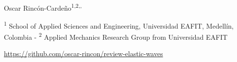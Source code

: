 \documentclass[11pt,twoside]{article}
\begin{document}
\begin{tcolorbox}[colback=white!20,colframe=gray!20,sharp corners]

{\begin{center}
Oscar Rincón-Cardeño\textsuperscript{1,2,,
}
\end{center}
}

\vspace{-0.3cm}

{\footnotesize
\textsuperscript{1} School of Applied Sciences and Engineering, Universidad EAFIT, 
Medellín, Colombia - \textsuperscript{2} Applied Mechanics Research Group from Universidad EAFIT
}


{\noindent\footnotesize{\href{https://github.com/oscar-rincon/review-elastic-waves}
{\textcolor{gray}{\faGithubSquare} https://github.com/oscar-rincon/review-elastic-waves}}}

\end{tcolorbox}

\end{document}
